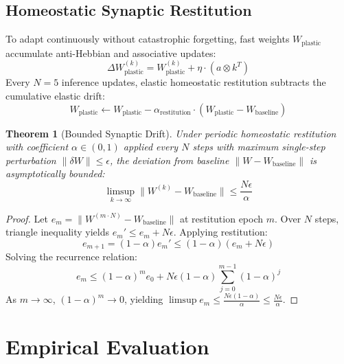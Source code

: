 \documentclass[11pt,a4paper]{article}
\newtheorem{theorem}{Theorem}
\begin{document}
\subsection{Homeostatic Synaptic Restitution}
To adapt continuously without catastrophic forgetting, fast weights $W_{\text{plastic}}$ accumulate anti-Hebbian and associative updates:
\begin{equation}
\Delta W_{\text{plastic}}^{(k)} = W_{\text{plastic}}^{(k)} + \eta \cdot (a \otimes k^T)
\end{equation}
Every $N = 5$ inference updates, elastic homeostatic restitution subtracts the cumulative elastic drift:
\begin{equation}
W_{\text{plastic}} \leftarrow W_{\text{plastic}} - \alpha_{\text{restitution}} \cdot (W_{\text{plastic}} - W_{\text{baseline}})
\end{equation}

\begin{theorem}[Bounded Synaptic Drift]
Under periodic homeostatic restitution with coefficient $\alpha \in (0, 1)$ applied every $N$ steps with maximum single-step perturbation $\|\delta W\| \le \epsilon$, the deviation from baseline $\|W - W_{\text{baseline}}\|$ is asymptotically bounded:
\begin{equation}
\limsup_{k \to \infty} \|W^{(k)} - W_{\text{baseline}}\| \le \frac{N \epsilon}{\alpha}
\end{equation}
\end{theorem}
\begin{proof}
Let $e_m = \|W^{(m \cdot N)} - W_{\text{baseline}}\|$ at restitution epoch $m$. Over $N$ steps, triangle inequality yields $e_{m}' \le e_m + N\epsilon$. Applying restitution:
\begin{equation}
e_{m+1} = (1 - \alpha) e_m' \le (1 - \alpha)(e_m + N\epsilon)
\end{equation}
Solving the recurrence relation:
\begin{equation}
e_m \le (1 - \alpha)^m e_0 + N\epsilon (1 - \alpha) \sum_{j=0}^{m-1} (1 - \alpha)^j
\end{equation}
As $m \to \infty$, $(1 - \alpha)^m \to 0$, yielding $\limsup e_m \le \frac{N\epsilon(1 - \alpha)}{\alpha} \le \frac{N\epsilon}{\alpha}$.
\end{proof}

\section{Empirical Evaluation}
\end{document}
